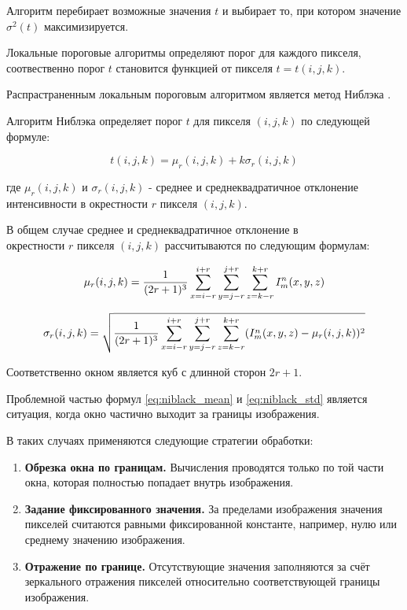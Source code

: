 Алгоритм перебирает возможные значения \(t\) и выбирает то, при котором значение \(\sigma^2(t)\) максимизируется. 

Локальные пороговые алгоритмы определяют порог для каждого пикселя, соотвественно порог \(t\) становится функцией от пикселя \(t = t(i, j, k)\).

Распрастраненным локальным пороговым алгоритмом является метод Ниблэка \cite{niblack1985introduction}.

Алгоритм Ниблэка определяет порог \(t\) для пикселя \((i, j, k)\) по следующей формуле:

\begin{equation} \label{eq:niblack}
    t(i, j, k) = \mu_r(i, j, k) + k \sigma_r(i, j, k)
\end{equation}

где \(\mu_r(i, j, k)\) и \(\sigma_r(i, j, k)\) - среднее и среднеквадратичное отклонение интенсивности в окрестности \(r\) пикселя \((i, j, k)\).

В общем случае среднее и среднеквадратичное отклонение в \\ окрестности \(r\) пикселя \((i, j, k)\) рассчитываются по следующим формулам:

\begin{equation}\label{eq:niblack_mean}
    \mu_r(i, j, k) = \frac{1}{(2r + 1)^3} \sum_{x = i - r}^{i + r} \sum_{y = j - r}^{j + r} \sum_{z = k - r}^{k + r} I^n_m(x, y, z)
\end{equation}

\begin{equation}\label{eq:niblack_std}
    \sigma_r(i, j, k) = \sqrt{\frac{1}{(2r + 1)^3} \sum_{x = i - r}^{i + r} \sum_{y = j - r}^{j + r} \sum_{z = k - r}^{k + r} (I^n_m(x, y, z) - \mu_r(i, j, k))^2}
\end{equation}

Соответственно окном является куб с длинной сторон \(2r + 1\). 

Проблемной частью формул \ref{eq:niblack_mean} и \ref{eq:niblack_std} является ситуация, когда окно частично выходит за границы изображения.

В таких случаях применяются следующие стратегии обработки:

\begin{enumerate}
    \item \textbf{Обрезка окна по границам.} Вычисления проводятся только по той части окна, которая полностью попадает внутрь изображения.
    
    \item \textbf{Задание фиксированного значения.} За пределами изображения значения пикселей считаются равными фиксированной константе, например, нулю или среднему значению изображения.
    
    \item \textbf{Отражение по границе.} Отсутствующие значения заполняются за счёт зеркального отражения пикселей относительно соответствующей границы изображения.
\end{enumerate}

